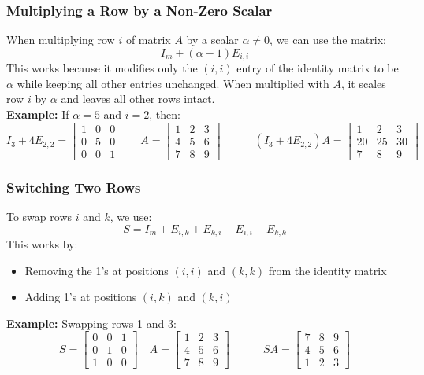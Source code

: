 \documentclass[a4paper, 9pt]{extarticle}
\begin{document}
\subsubsection{Multiplying a Row by a Non-Zero Scalar}
When multiplying row $i$ of matrix $A$ by a scalar $\alpha \neq 0$, we can use the matrix:
$$I_m + (\alpha - 1)E_{i,i}$$
This works because it modifies only the $(i,i)$ entry of the identity matrix to be $\alpha$ while keeping all other entries unchanged. When multiplied with $A$, it scales row $i$ by $\alpha$ and leaves all other rows intact.\\
\textbf{Example:} If $\alpha = 5$ and $i = 2$, then:
\vspace{-2ex}
$$
  I_3 + 4E_{2,2} = \begin{bmatrix}
    1 & 0 & 0 \\
    0 & 5 & 0 \\
    0 & 0 & 1
  \end{bmatrix}\
  \quad
  A = \begin{bmatrix}
    1 & 2 & 3 \\
    4 & 5 & 6 \\
    7 & 8 & 9
  \end{bmatrix}
  \quad \quad\quad
  (I_3 + 4E_{2,2})A = \begin{bmatrix}
    1  & 2  & 3  \\
    20 & 25 & 30 \\
    7  & 8  & 9
  \end{bmatrix}$$
\vspace{-4ex}
\subsubsection{Switching Two Rows}
To swap rows $i$ and $k$, we use:
$$S = I_m + E_{i,k} + E_{k,i} - E_{i,i} - E_{k,k}$$
This works by:
\begin{itemize}
  \item Removing the 1's at positions $(i,i)$ and $(k,k)$ from the identity matrix
  \item Adding 1's at positions $(i,k)$ and $(k,i)$
\end{itemize}
\vspace{-1ex}
\textbf{Example:} Swapping rows 1 and 3:
\vspace{-2ex}
$$  S = \begin{bmatrix}
    0 & 0 & 1 \\
    0 & 1 & 0 \\
    1 & 0 & 0
  \end{bmatrix}
  \quad
  A = \begin{bmatrix}
    1 & 2 & 3 \\
    4 & 5 & 6 \\
    7 & 8 & 9
  \end{bmatrix}
  \quad \quad\quad
  SA = \begin{bmatrix}
    7 & 8 & 9 \\
    4 & 5 & 6 \\
    1 & 2 & 3
  \end{bmatrix}$$
\vspace{-5ex}
\end{document}
